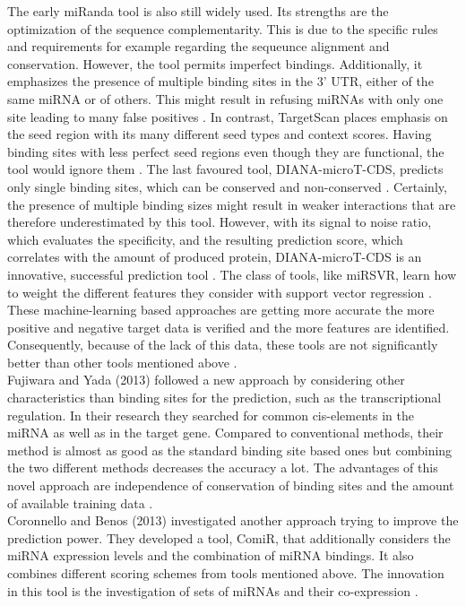 \documentclass[12pt,  a4paper]{report}
\begin{document}
The early miRanda tool is also still widely used. Its strengths are the optimization of the sequence complementarity. This is due to the specific rules and requirements for example regarding the sequeunce alignment and conservation. However, the tool permits imperfect bindings. Additionally, it emphasizes the presence of multiple binding sites in the 3' UTR, either of the same miRNA or of others. This might result in refusing miRNAs with only one site leading to many false positives \cite{John}. In contrast, TargetScan places emphasis on the seed region with its many different seed types and context scores. Having binding sites with less perfect seed regions even though they are functional, the tool would ignore them \cite{Lewis}. The last favoured tool, DIANA-microT-CDS, predicts only single binding sites, which can be conserved and non-conserved \cite{Kiriakidou}. Certainly, the presence of multiple binding sizes might result in weaker interactions that are therefore underestimated by this tool. However, with its signal to noise ratio, which evaluates the specificity, and the resulting prediction score, which correlates with the amount of produced protein, DIANA-microT-CDS is an innovative, successful prediction tool \cite{Maragkakis}. The class of tools, like miRSVR, learn how to weight the different features they consider with support vector regression \cite{Betel}. These machine-learning based approaches are getting more accurate the more positive and negative target data is verified and the more features are identified. Consequently, because of the lack of this data, these tools are not significantly better than other tools mentioned above \cite{Peterson}. \\

Fujiwara and Yada (2013) followed a new approach by considering other characteristics than binding sites for the prediction, such as the transcriptional regulation. In their research they searched for common cis-elements in the miRNA as well as in the target gene. Compared to conventional methods, their method is almost as good as the standard binding site based ones but combining the two different methods decreases the accuracy a lot. The advantages of this novel approach are independence of conservation of binding sites and the amount of available training data \cite{Fuji}. \\

Coronnello and Benos (2013) investigated another approach trying to improve the prediction power. They developed a tool, ComiR, that additionally considers the miRNA expression levels and the combination of miRNA bindings. It also combines different scoring schemes from tools mentioned above. The innovation in this tool is the investigation of sets of miRNAs and their co-expression \cite{Coronnello}. \\
\end{document}
